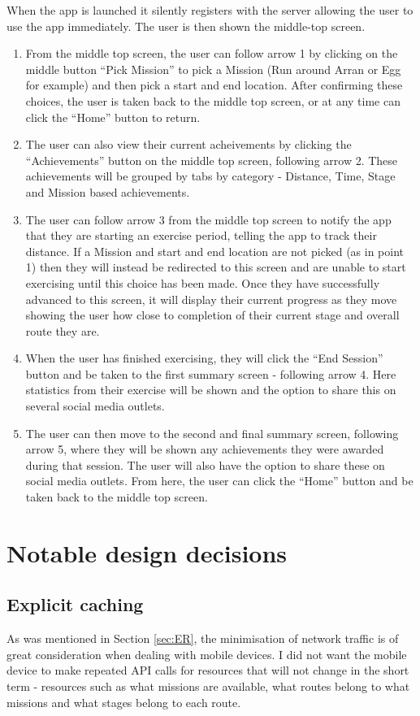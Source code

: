 When the app is launched it silently registers with the server
allowing the user to use the app immediately. The user is then shown
the middle-top screen.
\begin{enumerate}
\item From the middle top screen, the user can follow arrow 1 by
  clicking on the middle button ``Pick Mission'' to pick a Mission
  (Run around Arran or Egg for example) and then pick a start and
  end location. After confirming these choices, the user is taken
  back to the middle top screen, or at any time can click the
  ``Home'' button to return. 
\item The user can also view their current acheivements by clicking
  the ``Achievements'' button on the middle top screen, following
  arrow 2. These achievements will be grouped by tabs by category -
  Distance, Time, Stage and Mission based achievements.
\item The user can follow arrow 3 from the middle top screen to
  notify the app that they are starting an exercise period, telling
  the app to track their distance. If a Mission and start and end
  location are not picked (as in point 1) then they will instead be
  redirected to this screen and are unable to start exercising until
  this choice has been made. Once they have successfully advanced to
  this screen, it will display their current progress as they move
  showing the user how close to completion of their current stage
  and overall route they are. 
\item When the user has finished exercising, they will click the
  ``End Session'' button and be taken to the first summary screen -
  following arrow 4. Here statistics from their exercise will be
  shown and the option to share this on several social media
  outlets.
\item The user can then move to the second and final summary screen,
  following arrow 5, where they will be shown any achievements they
  were awarded during that session. The user will also have the
  option to share these on social media outlets. From here, the user
  can click the ``Home'' button and be taken back to the middle top
  screen. 
\end{enumerate}

\section{Notable design decisions}\label{sec_notable}
\subsection{Explicit caching}
As was mentioned in Section \ref{sec:ER}, the minimisation of network
traffic is of great consideration when dealing with mobile devices. I
did not want the mobile device to make repeated API calls for
resources that will not change in the short term - resources such as
what missions are available, what routes belong to what missions and
what stages belong to each route. 

